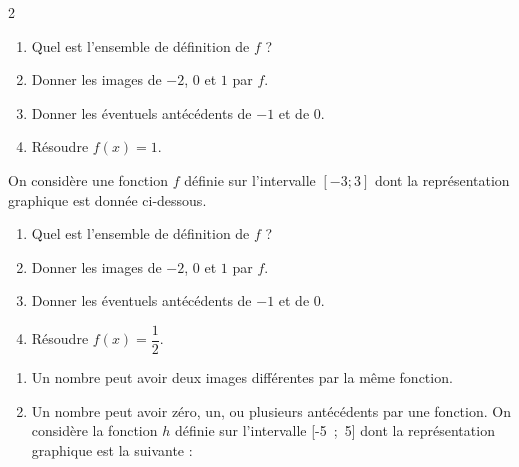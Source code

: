 \documentclass[10pt,a4paper]{article}
\begin{document}
\begin{multicols}{2}
\begin{exo}[][]

\begin{enumerate}[leftmargin=*]
    \item Quel est l'ensemble de définition de \(f\) ?
    \item Donner les images de \(-2\), \(0\) et \(1\) par \(f\).
    \item Donner les éventuels antécédents de \(-1\) et de \(0\).
    \item Résoudre \(f(x)=1\).
\end{enumerate}
\end{exo}

\begin{exo}[][]
    On considère une fonction \(f\) définie sur l'intervalle \([-3;3]\) dont la représentation graphique est donnée ci-dessous.


\begin{enumerate}[leftmargin=*]
    \item Quel est l'ensemble de définition de \(f\) ?
    \item Donner les images de \(-2\), \(0\) et \(1\) par \(f\).
    \item Donner les éventuels antécédents de \(-1\) et de \(0\).
    \item Résoudre \(f(x)=\dfrac{1}{2}\).
\end{enumerate}
\end{exo}

\begin{exo}
    \begin{enumerate}
        \item Un nombre peut avoir deux images différentes par la même fonction.
        \item Un nombre peut avoir zéro, un, ou plusieurs antécédents par une fonction.
        \medbreak
        On considère la fonction \(h\) définie sur l'intervalle [-5\ ;\ 5] dont la représentation graphique est la suivante :


\end{enumerate}
\end{exo}
\end{multicols}
\end{document}
